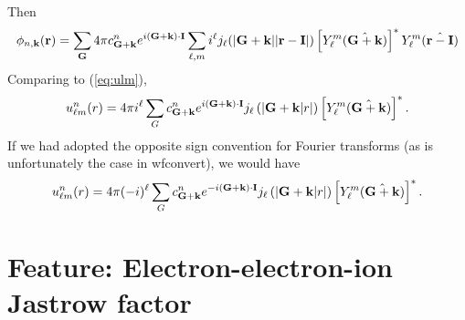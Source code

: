 Then
\begin{equation}
\phi_{n,\vk}(\vr) =  \sum_\vG 4\pi c_{\vG+\vk}^n
e^{i(\vG+\vk)\cdot\vI} \sum_{\ell,m}
  i^\ell j_\ell(|\vG +\vk||\vr-\vI|)
  \left[Y_\ell^m(\hat{\vG+\vk})\right]^*
Y_\ell^m(\hat{\vr - \vI})
\end{equation}
Comparing to (\ref{eq:ulm}),
\begin{equation}
u_{\ell m}^n(r) = 4\pi i^\ell \sum_G c_{\vG+\vk}^n e^{i(\vG+\vk)\cdot\vI}  j_\ell\left(|\vG + \vk|r|\right)
\left[Y_\ell^m(\hat{\vG + \vk})\right]^*.
\end{equation}
If we had adopted the opposite sign convention for Fourier transforms
(as is unfortunately the case in wfconvert), we would have
\begin{equation}
u_{\ell m}^n(r) = 4\pi (-i)^\ell \sum_G c_{\vG+\vk}^n e^{-i(\vG+\vk)\cdot\vI}  j_\ell\left(|\vG + \vk|r|\right)
\left[Y_\ell^m(\hat{\vG + \vk})\right]^*.
\end{equation}




\newpage
\section{Feature: Electron-electron-ion Jastrow factor}


